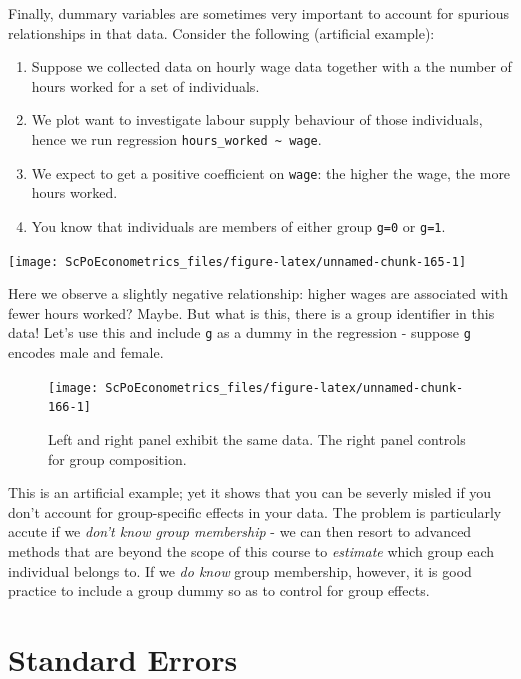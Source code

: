 \documentclass[]{book}
\providecommand{\tightlist}{%
  \setlength{\itemsep}{0pt}\setlength{\parskip}{0pt}}
\begin{document}
Finally, dummary variables are sometimes very important to account for spurious relationships in that data. Consider the following (artificial example):

\begin{enumerate}
\def\labelenumi{\arabic{enumi}.}
\tightlist
\item
  Suppose we collected data on hourly wage data together with a the number of hours worked for a set of individuals.
\item
  We plot want to investigate labour supply behaviour of those individuals, hence we run regression \texttt{hours\_worked\ \textasciitilde{}\ wage}.
\item
  We expect to get a positive coefficient on \texttt{wage}: the higher the wage, the more hours worked.
\item
  You know that individuals are members of either group \texttt{g=0} or \texttt{g=1}.
\end{enumerate}

\begin{center}\texttt{[image: ScPoEconometrics\_files/figure-latex/unnamed-chunk-165-1]} \end{center}

Here we observe a slightly negative relationship: higher wages are associated with fewer hours worked? Maybe. But what is this, there is a group identifier in this data! Let's use this and include \texttt{g} as a dummy in the regression - suppose \texttt{g} encodes male and female.

\begin{figure}

{\centering \texttt{[image: ScPoEconometrics\_files/figure-latex/unnamed-chunk-166-1]} 

}

\caption{Left and right panel exhibit the same data. The right panel controls for group composition.}\label{fig:unnamed-chunk-166}
\end{figure}

This is an artificial example; yet it shows that you can be severly misled if you don't account for group-specific effects in your data. The problem is particularly accute if we \emph{don't know group membership} - we can then resort to advanced methods that are beyond the scope of this course to \emph{estimate} which group each individual belongs to. If we \emph{do know} group membership, however, it is good practice to include a group dummy so as to control for group effects.

\hypertarget{std-errors}{%
\chapter{Standard Errors}\label{std-errors}}
\end{document}

